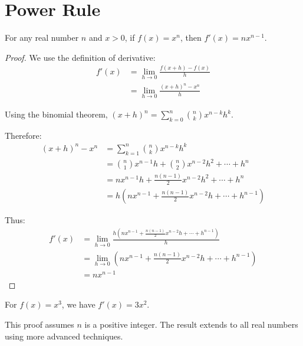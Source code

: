 
\section{Power Rule}

\begin{theorem}
For any real number $n$ and $x > 0$, if $f(x) = x^n$, then $f'(x) = nx^{n-1}$.
\end{theorem}

\begin{proof}
We use the definition of derivative:
\begin{align}
f'(x) &= \lim_{h \to 0} \frac{f(x+h) - f(x)}{h} \\
&= \lim_{h \to 0} \frac{(x+h)^n - x^n}{h}
\end{align}

Using the binomial theorem, $(x+h)^n = \sum_{k=0}^{n} \binom{n}{k} x^{n-k} h^k$.

Therefore:
\begin{align}
(x+h)^n - x^n &= \sum_{k=1}^{n} \binom{n}{k} x^{n-k} h^k \\
&= \binom{n}{1} x^{n-1} h + \binom{n}{2} x^{n-2} h^2 + \cdots + h^n \\
&= nx^{n-1}h + \frac{n(n-1)}{2}x^{n-2}h^2 + \cdots + h^n \\
&= h\left(nx^{n-1} + \frac{n(n-1)}{2}x^{n-2}h + \cdots + h^{n-1}\right)
\end{align}

Thus:
\begin{align}
f'(x) &= \lim_{h \to 0} \frac{h\left(nx^{n-1} + \frac{n(n-1)}{2}x^{n-2}h + \cdots + h^{n-1}\right)}{h} \\
&= \lim_{h \to 0} \left(nx^{n-1} + \frac{n(n-1)}{2}x^{n-2}h + \cdots + h^{n-1}\right) \\
&= nx^{n-1}
\end{align}
\end{proof}

\begin{example}
For $f(x) = x^3$, we have $f'(x) = 3x^2$.
\end{example}

\begin{remark}
This proof assumes $n$ is a positive integer. The result extends to all real numbers using more advanced techniques.
\end{remark}